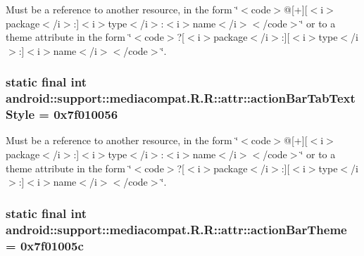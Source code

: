 Must be a reference to another resource, in the form \char`\"{}$<$code$>$@\mbox{[}+\mbox{]}\mbox{[}$<$i$>$package$<$/i$>$:\mbox{]}$<$i$>$type$<$/i$>$:$<$i$>$name$<$/i$>$$<$/code$>$\char`\"{} or to a theme attribute in the form \char`\"{}$<$code$>$?\mbox{[}$<$i$>$package$<$/i$>$:\mbox{]}\mbox{[}$<$i$>$type$<$/i$>$:\mbox{]}$<$i$>$name$<$/i$>$$<$/code$>$\char`\"{}. \hypertarget{classandroid_1_1support_1_1mediacompat_1_1_r_1_1attr_e0211a6f0bc4feead58bdbd66a36c853}{
\subsubsection[{actionBarTabTextStyle}]{\setlength{\rightskip}{0pt plus 5cm}static final int android::support::mediacompat.R.R::attr::actionBarTabTextStyle = 0x7f010056}}
\label{classandroid_1_1support_1_1mediacompat_1_1_r_1_1attr_e0211a6f0bc4feead58bdbd66a36c853}


Must be a reference to another resource, in the form \char`\"{}$<$code$>$@\mbox{[}+\mbox{]}\mbox{[}$<$i$>$package$<$/i$>$:\mbox{]}$<$i$>$type$<$/i$>$:$<$i$>$name$<$/i$>$$<$/code$>$\char`\"{} or to a theme attribute in the form \char`\"{}$<$code$>$?\mbox{[}$<$i$>$package$<$/i$>$:\mbox{]}\mbox{[}$<$i$>$type$<$/i$>$:\mbox{]}$<$i$>$name$<$/i$>$$<$/code$>$\char`\"{}. \hypertarget{classandroid_1_1support_1_1mediacompat_1_1_r_1_1attr_8ea66b10eeb9aaae8eddeca4831e9d29}{
\subsubsection[{actionBarTheme}]{\setlength{\rightskip}{0pt plus 5cm}static final int android::support::mediacompat.R.R::attr::actionBarTheme = 0x7f01005c}}
\label{classandroid_1_1support_1_1mediacompat_1_1_r_1_1attr_8ea66b10eeb9aaae8eddeca4831e9d29}


